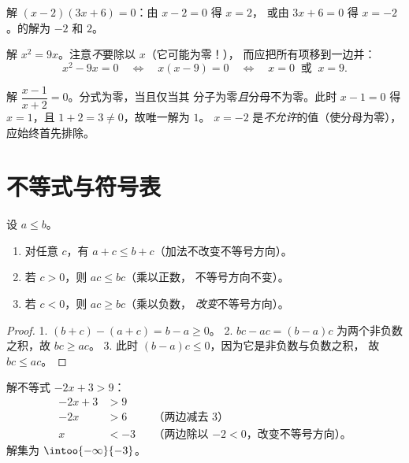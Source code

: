 \begin{example}\label{ex:g10:algebra:zeroproduct}
解 $(x - 2)(3x + 6) = 0$：由 $x - 2 = 0$ 得 $x = 2$，
或由 $3x + 6 = 0$ 得 $x = -2$。的解为 $-2$ 和 $2$。

解 $x^2 = 9x$。注意\emph{不}要除以 $x$（它可能为零！），
而应把所有项移到一边并：
\[
x^2 - 9x = 0
\quad\Longleftrightarrow\quad
x(x - 9) = 0
\quad\Longleftrightarrow\quad
x = 0 \ \text{ 或 } \ x = 9 .
\]
\end{example}

\begin{example}[分式方程]\label{ex:g10:algebra:quotient}
解 $\dfrac{x - 1}{x + 2} = 0$。分式为零，当且仅当其
分子为零\emph{且}分母不为零。此时 $x - 1 = 0$
得 $x = 1$，且 $1 + 2 = 3 \neq 0$，故唯一解为 $1$。
$x = -2$ 是\emph{不允许}的值（使分母为零），
应始终首先排除。
\end{example}

\section{不等式与符号表}

\begin{proposition}[不等式的性质]\label{prop:g10:algebra:ineqrules}
设 $a \leq b$。
\begin{enumerate}
  \item 对任意 $c$，有 $a + c \leq b + c$（加法不改变不等号方向）。
  \item 若 $c > 0$，则 $ac \leq bc$（乘以正数，
        不等号方向不变）。
  \item 若 $c < 0$，则 $ac \geq bc$（乘以负数，
        \emph{改变}不等号方向）。
\end{enumerate}
\end{proposition}

\begin{proof}
1. $(b + c) - (a + c) = b - a \geq 0$。
2. $bc - ac = (b-a)c$ 为两个非负数之积，故
$bc \geq ac$。
3. 此时 $(b-a)c \leq 0$，因为它是非负数与负数之积，
故 $bc \leq ac$。
\end{proof}

\begin{example}\label{ex:g10:algebra:firstineq}
解不等式 $-2x + 3 > 9$：
\begin{align*}
-2x + 3 &> 9 \\
-2x &> 6 && \text{（两边减去 3）} \\
x &< -3 && \text{（两边除以 $-2 < 0$，改变不等号方向）。}
\end{align*}
解集为 $\intoo{-\infty}{-3}$。
\end{example}

